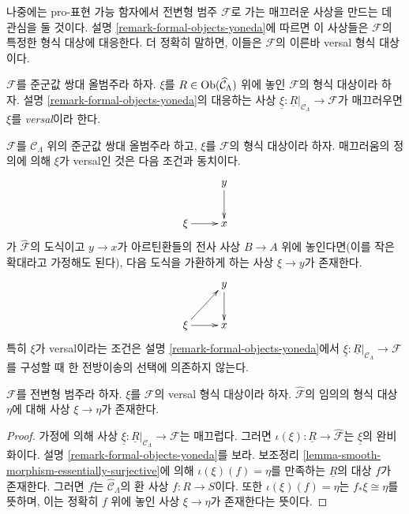 \noindent
나중에는 pro-표현 가능 함자에서 전변형 범주 $\mathcal{F}$로 가는
매끄러운 사상을 만드는 데 관심을 둘 것이다. 설명
\ref{remark-formal-objects-yoneda}에 따르면 이 사상들은
$\mathcal{F}$의 특정한 형식 대상에 대응한다. 더 정확히 말하면,
이들은 $\mathcal{F}$의 이른바 versal 형식 대상이다.

\begin{definition}
\label{definition-versal}
$\mathcal{F}$를 준군값 쌍대 올범주라 하자. $\xi$를
$R \in \mathop{\mathrm{Ob}}\nolimits(\widehat{\mathcal{C}}_\Lambda)$ 위에 놓인
$\mathcal{F}$의 형식 대상이라 하자. 설명
\ref{remark-formal-objects-yoneda}의 대응하는 사상
$\underline{\xi}: \underline{R}|_{\mathcal{C}_\Lambda} \to \mathcal{F}$가
매끄러우면 $\xi$를 {\it versal}이라 한다.
\end{definition}

\begin{remark}
\label{remark-versal-object}
$\mathcal{F}$를 $\mathcal C_\Lambda$ 위의 준군값 쌍대
올범주라 하고, $\xi$를 $\mathcal{F}$의 형식 대상이라 하자.
매끄러움의 정의에 의해 $\xi$가 versal인 것은 다음 조건과 동치이다.
$$
\xymatrix{
& y \ar[d] \\
\xi \ar[r] & x
}
$$
가 $\widehat{\mathcal{F}}$의 도식이고 $y \to x$가 아르틴환들의
전사 사상 $B \to A$ 위에 놓인다면(이를 작은 확대라고 가정해도 된다),
다음 도식을 가환하게 하는 사상 $\xi \to y$가 존재한다.
$$
\xymatrix{
& y \ar[d] \\
\xi \ar[r] \ar[ur] & x
}
$$
특히 $\xi$가 versal이라는 조건은 설명
\ref{remark-formal-objects-yoneda}에서
$\underline{\xi} : \underline{R}|_{\mathcal{C}_\Lambda} \to \mathcal{F}$를
구성할 때 한 전방이송의 선택에 의존하지 않는다.
\end{remark}

\begin{lemma}
\label{lemma-versal-object-quasi-initial}
$\mathcal{F}$를 전변형 범주라 하자. $\xi$를 $\mathcal{F}$의 versal
형식 대상이라 하자. $\widehat{\mathcal{F}}$의 임의의 형식 대상
$\eta$에 대해 사상 $\xi \to \eta$가 존재한다.%
\end{lemma}

\begin{proof}
가정에 의해 사상
$\underline{\xi} : \underline{R}|_{\mathcal{C}_\Lambda} \to \mathcal{F}$는
매끄럽다. 그러면 $\iota(\xi) : \underline{R} \to \widehat{\mathcal{F}}$는
$\underline{\xi}$의 완비화이다. 설명
\ref{remark-formal-objects-yoneda}를 보라. 보조정리
\ref{lemma-smooth-morphism-essentially-surjective}에 의해
$\iota(\xi)(f) = \eta$를 만족하는 $\underline{R}$의 대상 $f$가
존재한다. 그러면 $f$는 $\widehat{\mathcal{C}}_\Lambda$의 환 사상
$f : R \to S$이다. 또한 $\iota(\xi)(f) = \eta$는
$f_*\xi \cong \eta$를 뜻하며, 이는 정확히 $f$ 위에 놓인 사상
$\xi \to \eta$가 존재한다는 뜻이다.
\end{proof}

